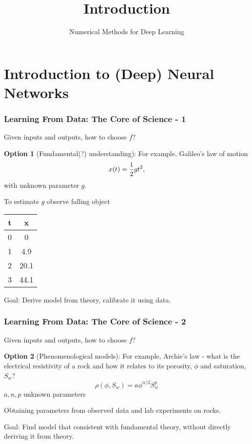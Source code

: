 \documentclass[12pt,fleqn]{beamer}
\title[Intro]{Introduction}
\subtitle{Numerical Methods for Deep Learning}
\date{}
\begin{document}
\makebeamertitle

\section{Introduction to (Deep) Neural Networks} %
\label{sec:introduction_to_deep_neural_networks}


\begin{frame}\frametitle{Learning From Data: The Core of Science - 1}


Given inputs and outputs, how to choose $f$?

\bigskip


\textbf{Option 1} (Fundamental(?) understanding): For example, Galileo's law of motion
$$ x(t) = {\frac 12} g t^2, $$
with unknown parameter $g$. 

\pause

To estimate $g$ observe falling object
\begin{center}
\begin{tabular}{cc}
t   &  x \\ \hline
0  &  0  \\
1  & 4.9  \\
2  & 20.1 \\
3  & 44.1 \\
\end{tabular}
\end{center}

\bigskip

Goal: Derive model from theory, calibrate it using data.

\end{frame}


\begin{frame}\frametitle{Learning From Data: The Core of Science - 2}



Given inputs and outputs, how to choose $f$?

\bigskip

\textbf{Option 2} (Phenomenological models): For example, Archie's law - what is the electrical resistivity of a rock
 and how it relates to its porosity, $\phi$ and saturation, $S_w$?
$$ \rho(\phi,S_w) = a \phi^{n/2} S_w^p $$
$a,n,p$ unknown parameters


\bigskip

Obtaining parameters from observed data and lab experiments on rocks.

\bigskip

Goal: Find model that consistent with fundamental theory, without directly deriving it from theory.


\end{frame}
\end{document}
